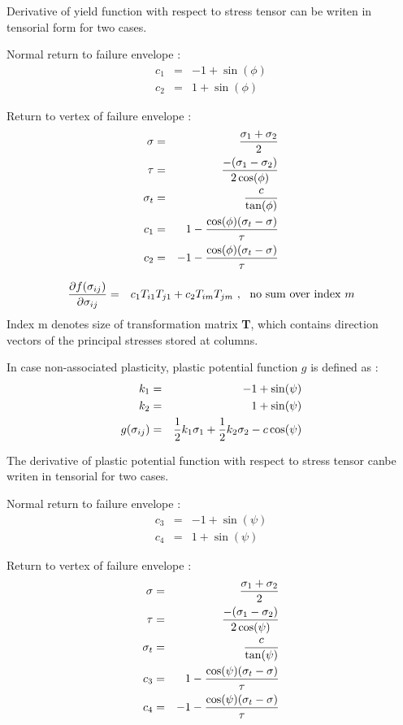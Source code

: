 Derivative of yield function with respect to stress tensor can be writen in tensorial form for two cases.

Normal return to failure envelope :
\begin{eqnarray}
c_1 &=& -1 + \sin(\phi)  \\
c_2 &=& 1 + \sin(\phi)
\end{eqnarray}

Return to vertex of failure envelope :
\begin{eqnarray}
\sigma &=& \mbox{$\displaystyle\frac{\sigma_1+\sigma_2}{2}$} \\
\tau   &=& \mbox{$\displaystyle\frac{-(\sigma_1-\sigma_2)}{2 \cos(\phi)}$} \\
\sigma_t &=& \mbox{$\displaystyle\frac{c}{\tan(\phi)}$} \\
c_1 &=& 1 - \mbox{$\displaystyle\frac{\cos(\phi)(\sigma_t-\sigma)}{\tau}$} \\
c_2 &=& -1 - \mbox{$\displaystyle\frac{\cos(\phi)(\sigma_t-\sigma)}{\tau}$}
\end{eqnarray}

\begin{eqnarray}
\mbox{$\displaystyle\frac{\partial{f(\sigma_{ij})}}{\partial{\sigma_{ij}}}$} &=& c_1 T_{i1} T_{j1} + c_2 T_{im} T_{jm} {\rm \ ,\ \ no\ sum\ over\ index\ } m
\end{eqnarray}
Index m denotes size of transformation matrix {\bf T}, which contains direction vectors of the principal stresses
stored at columns.

In case non-associated  plasticity, plastic  potential function $g$ is defined as :
\begin{eqnarray}
k_1 &=& -1+\sin(\psi) \\
k_2 &=& 1+\sin(\psi) \\
g(\sigma_{ij}) &=& \mbox{$\displaystyle\frac{1}{2}$}k_1\sigma_1+ \mbox{$\displaystyle\frac{1}{2}$}k_2\sigma_2-c\cos(\psi)
\end{eqnarray}

The derivative of plastic potential function with respect to stress tensor canbe writen in tensorial for two cases.

Normal return to failure envelope :
\begin{eqnarray}
c_3 &=& -1 + \sin(\psi)  \\
c_4 &=& 1 + \sin(\psi)
\end{eqnarray}

Return to vertex of failure envelope :
\begin{eqnarray}
\sigma &=& \mbox{$\displaystyle\frac{\sigma_1+\sigma_2}{2}$} \\
\tau   &=& \mbox{$\displaystyle\frac{-(\sigma_1-\sigma_2)}{2 \cos(\psi)}$} \\
\sigma_t &=& \mbox{$\displaystyle\frac{c}{\tan(\psi)}$} \\
c_3 &=& 1 - \mbox{$\displaystyle\frac{\cos(\psi)(\sigma_t-\sigma)}{\tau}$} \\
c_4 &=& -1 - \mbox{$\displaystyle\frac{\cos(\psi)(\sigma_t-\sigma)}{\tau}$}
\end{eqnarray}

